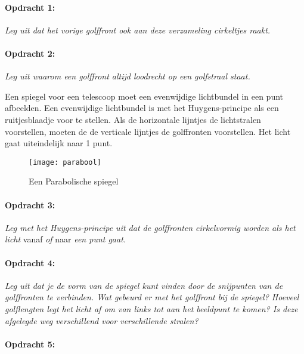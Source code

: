 \paragraph*{Opdracht 1:}

\emph{Leg uit dat het vorige golffront ook aan deze verzameling cirkeltjes
raakt.}

\paragraph*{Opdracht 2:}

\emph{Leg uit waarom een golffront altijd loodrecht op een golfstraal
staat.}

Een spiegel voor een telescoop moet een evenwijdige lichtbundel in
een punt afbeelden. Een evenwijdige lichtbundel is met het Huygens-principe
als een ruitjesblaadje voor te stellen. Als de horizontale lijntjes
de lichtstralen voorstellen, moeten de de verticale lijntjes de golffronten
voorstellen. Het licht gaat uiteindelijk naar 1 punt.

\begin{figure}[H]
\noindent \begin{centering}
\texttt{[image: parabool]}
\par\end{centering}

\caption{Een Parabolische spiegel}
\end{figure}


\paragraph*{Opdracht 3:}

\emph{Leg met het Huygens-principe uit dat de golffronten cirkelvormig
worden als het licht }vanaf\emph{ of }naar\emph{ een punt gaat.}

\paragraph*{Opdracht 4:}

\emph{Leg uit dat je de vorm van de spiegel kunt vinden door de snijpunten
van de golffronten te verbinden. Wat gebeurd er met het golffront
bij de spiegel? Hoeveel golflengten legt het licht af om van links
tot aan het beeldpunt te komen? Is deze afgelegde weg verschillend
voor verschillende stralen?}

\paragraph*{Opdracht 5:}

